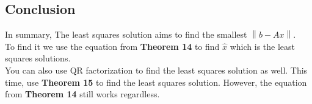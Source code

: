 \documentclass{article}
\begin{document}
\subsection*{Conclusion}
In summary, The least squares solution aims to find the smallest $\left \|  b-Ax \right \|$.\\
To find it we use the equation from \textbf{Theorem 14} to find $\hat{x}$ which is the least squares solutions.\\
You can also use QR factorization to find the least squares solution as well. This time, use \textbf{Theorem 15} to find the least squares solution.
However, the equation from \textbf{Theorem 14} still works regardless.
\end{document}
